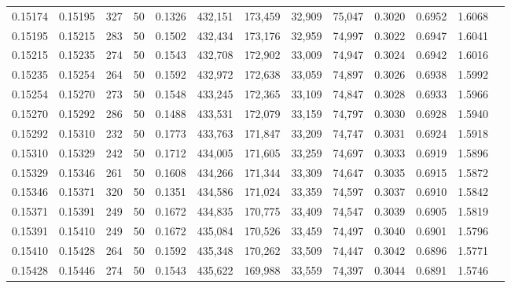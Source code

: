 \begin{tabular}{rrrrrrrrrrrrr}
0.15174 & 0.15195 &   327 &  50 &                                     0.1326 & 432,151 & 173,459 &  32,909 &  75,047 & 0.3020 & 0.6952 & 1.6068 \\
0.15195 & 0.15215 &   283 &  50 &                                     0.1502 & 432,434 & 173,176 &  32,959 &  74,997 & 0.3022 & 0.6947 & 1.6041 \\
0.15215 & 0.15235 &   274 &  50 &                                     0.1543 & 432,708 & 172,902 &  33,009 &  74,947 & 0.3024 & 0.6942 & 1.6016 \\
0.15235 & 0.15254 &   264 &  50 &                                     0.1592 & 432,972 & 172,638 &  33,059 &  74,897 & 0.3026 & 0.6938 & 1.5992 \\
0.15254 & 0.15270 &   273 &  50 &                                     0.1548 & 433,245 & 172,365 &  33,109 &  74,847 & 0.3028 & 0.6933 & 1.5966 \\
0.15270 & 0.15292 &   286 &  50 &                                     0.1488 & 433,531 & 172,079 &  33,159 &  74,797 & 0.3030 & 0.6928 & 1.5940 \\
0.15292 & 0.15310 &   232 &  50 &                                     0.1773 & 433,763 & 171,847 &  33,209 &  74,747 & 0.3031 & 0.6924 & 1.5918 \\
0.15310 & 0.15329 &   242 &  50 &                                     0.1712 & 434,005 & 171,605 &  33,259 &  74,697 & 0.3033 & 0.6919 & 1.5896 \\
0.15329 & 0.15346 &   261 &  50 &                                     0.1608 & 434,266 & 171,344 &  33,309 &  74,647 & 0.3035 & 0.6915 & 1.5872 \\
0.15346 & 0.15371 &   320 &  50 &                                     0.1351 & 434,586 & 171,024 &  33,359 &  74,597 & 0.3037 & 0.6910 & 1.5842 \\
0.15371 & 0.15391 &   249 &  50 &                                     0.1672 & 434,835 & 170,775 &  33,409 &  74,547 & 0.3039 & 0.6905 & 1.5819 \\
0.15391 & 0.15410 &   249 &  50 &                                     0.1672 & 435,084 & 170,526 &  33,459 &  74,497 & 0.3040 & 0.6901 & 1.5796 \\
0.15410 & 0.15428 &   264 &  50 &                                     0.1592 & 435,348 & 170,262 &  33,509 &  74,447 & 0.3042 & 0.6896 & 1.5771 \\
0.15428 & 0.15446 &   274 &  50 &                                     0.1543 & 435,622 & 169,988 &  33,559 &  74,397 & 0.3044 & 0.6891 & 1.5746 \\

\end{tabular}
